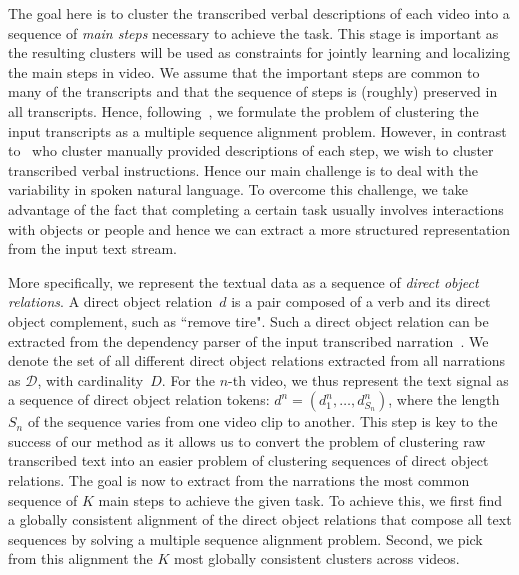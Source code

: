 \documentclass[10pt,twocolumn,letterpaper]{article}
\begin{document}
The goal here is to cluster the transcribed verbal descriptions of each video into a sequence of \emph{main steps} necessary to achieve the task.  
This stage is important as the resulting clusters will be used as constraints for jointly learning and localizing the main steps in video. 
We assume that the important steps are common to many of the transcripts and that the sequence of steps is (roughly) preserved in all transcripts.  
Hence, following~\cite{Regneri10learning}, we formulate the problem of clustering the input transcripts as a multiple sequence alignment problem.
However, in contrast to~\cite{Regneri10learning} who cluster manually provided descriptions of each step, we wish to cluster transcribed verbal instructions.
Hence our main challenge is to deal with the variability in spoken natural language.  To overcome this challenge, we take advantage of the fact that completing a certain task usually involves interactions with objects or people and hence we can extract a more structured representation from the input text stream.      

More specifically, we represent the textual data as a sequence of {\em direct object relations}.
A direct object relation~$d$  is a pair composed of a verb and its direct object complement, such as ``remove tire".
Such a direct object relation can be extracted from the dependency parser of the input transcribed narration~\cite{Marneffe06generating}.
%
We denote the set of all different direct object relations extracted from all narrations as $\mathcal{D}$,
with cardinality~$D$. 
%
%
For the $n$-th video, we thus represent the text signal as a sequence of direct object relation tokens: $d^n = (d_1^n, \dots, d_{S_n}^n)$, where the length $S_n$ of the sequence varies from one video clip to another. 
This step is key to the success of our method as it allows us to convert the problem of clustering raw transcribed text into an easier problem of clustering sequences of direct object relations.    
%
%
The goal is now to extract from the narrations the most common sequence of  $K$ main steps to achieve the given task. 
%
To achieve this, we first find a globally consistent alignment of the direct object relations that compose all text sequences by solving a multiple sequence alignment problem.
Second, we pick from this alignment the $K$ most globally consistent clusters across videos. %
%

%
%
%
%
%
%
%
%
%
%
%
%
%
%
%
%
\end{document}
